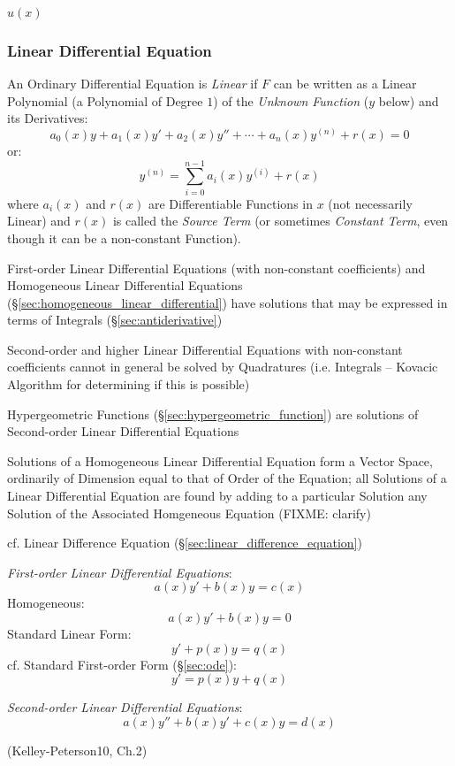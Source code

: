 $u(x)$



\subsubsection{Linear Differential Equation}
\label{sec:linear_differential_equation}

An Ordinary Differential Equation is \emph{Linear} if $F$ can be written as a
Linear Polynomial (a Polynomial of Degree $1$) of the \emph{Unknown Function}
($y$ below) and its Derivatives:
\[
  a_0(x)y + a_1(x)y' + a_2(x)y'' + \cdots + a_n(x)y^{(n)} + r(x) = 0
\]
or:
\[
  y^{(n)} = \sum_{i=0}^{n-1} a_i(x) y^{(i)} + r(x)
\]
where $a_i(x)$ and $r(x)$ are Differentiable Functions in $x$ (not necessarily
Linear) and $r(x)$ is called the \emph{Source Term} (or sometimes
\emph{Constant Term}, even though it can be a non-constant Function).

First-order Linear Differential Equations (with non-constant coefficients) and
Homogeneous Linear Differential Equations
(\S\ref{sec:homogeneous_linear_differential}) have solutions that may
be expressed in terms of Integrals (\S\ref{sec:antiderivative})

Second-order and higher Linear Differential Equations with non-constant
coefficients cannot in general be solved by Quadratures (i.e. Integrals --
Kovacic Algorithm for determining if this is possible)

Hypergeometric Functions (\S\ref{sec:hypergeometric_function}) are solutions of
Second-order Linear Differential Equations

Solutions of a Homogeneous Linear Differential Equation form a Vector Space,
ordinarily of Dimension equal to that of Order of the Equation; all Solutions
of a Linear Differential Equation are found by adding to a particular Solution
any Solution of the Associated Homgeneous Equation (FIXME: clarify)

cf. Linear Difference Equation (\S\ref{sec:linear_difference_equation})

\emph{First-order Linear Differential Equations}:
\[
  a(x) y' + b(x) y = c(x)
\]
Homogeneous:
\[
  a(x) y' + b(x) y = 0
\]
Standard Linear Form:
\[
  y' + p(x) y = q(x)
\]
cf. Standard First-order Form (\S\ref{sec:ode}):
\[
  y' = p(x) y + q(x)
\]

\emph{Second-order Linear Differential Equations}:
\[
  a(x) y'' + b(x) y' + c(x) y = d(x)
\]

\asterism

(Kelley-Peterson10, Ch.2)

